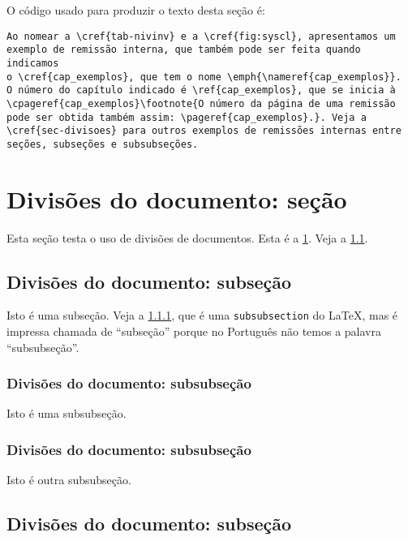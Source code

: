 O código usado para produzir o texto desta seção é:

\begin{verbatim}
Ao nomear a \cref{tab-nivinv} e a \cref{fig:syscl}, apresentamos um 
exemplo de remissão interna, que também pode ser feita quando indicamos
o \cref{cap_exemplos}, que tem o nome \emph{\nameref{cap_exemplos}}. 
O número do capítulo indicado é \ref{cap_exemplos}, que se inicia à
\cpageref{cap_exemplos}\footnote{O número da página de uma remissão 
pode ser obtida também assim: \pageref{cap_exemplos}.}. Veja a 
\cref{sec-divisoes} para outros exemplos de remissões internas entre 
seções, subseções e subsubseções.
\end{verbatim}

\section{Divisões do documento: seção}\label{sec-divisoes}

Esta seção testa o uso de divisões de documentos. Esta é a \cref{sec-divisoes}. Veja a \cref{sec-divisoes-subsection}.

\subsection{Divisões do documento: subseção}\label{sec-divisoes-subsection}

Isto é uma subseção. Veja a \cref{sec-divisoes-subsubsection}, que é uma \texttt{subsubsection} do \LaTeX, mas é impressa chamada de ``subseção'' porque no Português não temos a palavra ``subsubseção''.

\subsubsection{Divisões do documento: subsubseção}
\label{sec-divisoes-subsubsection}

Isto é uma subsubseção.

\subsubsection{Divisões do documento: subsubseção}

Isto é outra subsubseção.

\subsection{Divisões do documento: subseção}\label{sec-exemplo-subsec}


